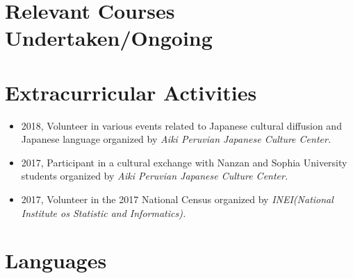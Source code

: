\documentclass[11pt,a4paper,sans]{moderncv}        %
\begin{document}
\section{Relevant Courses Undertaken/Ongoing}

\section{Extracurricular Activities}
\begin{itemize}
\item{2018, Volunteer in various events related to Japanese cultural diffusion and Japanese language organized by }\textit{Aiki Peruvian Japanese Culture Center.}
\item{2017, Participant in a cultural exchange with Nanzan and Sophia University students organized by }\textit{Aiki Peruvian Japanese Culture Center.} 
\item{2017, Volunteer in the 2017 National Census organized by }\textit{INEI(National Institute os Statistic and Informatics).}
\end{itemize}




\section{Languages}
\end{document}

